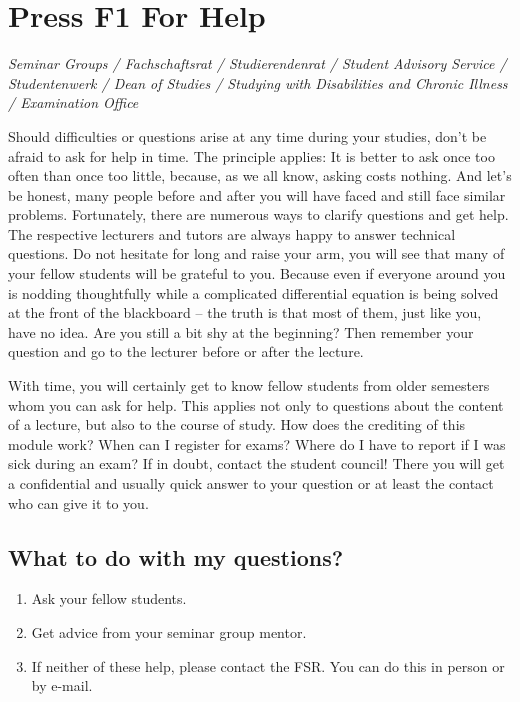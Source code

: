 \chapter{Press F1 For Help}

\textit{Seminar Groups / Fachschaftsrat / Studierendenrat / Student Advisory Service / Studentenwerk 
/ Dean of Studies / Studying with Disabilities and Chronic Illness / Examination Office}


Should difficulties or questions arise at any time during your studies, don't be afraid to ask for help in time.
The principle applies: It is better to ask once too often than once too little, because, as we all know, asking costs nothing.
And let's be honest, many people before and after you will have faced and still face similar problems.
Fortunately, there are numerous ways to clarify questions and get help.
The respective lecturers and tutors are always happy to answer technical questions.
Do not hesitate for long and raise your arm, you will see that many of your fellow students will be grateful to you.
Because even if everyone around you is nodding thoughtfully while a complicated differential equation is being solved at the front of the blackboard -- the truth is that most of them, just like you, have no idea.
Are you still a bit shy at the beginning? Then remember your question and go to the lecturer before or after the lecture.

With time, you will certainly get to know fellow students from older semesters whom you can ask for help.
This applies not only to questions about the content of a lecture, but also to the course of study.
How does the crediting of this module work? When can I register for exams? Where do I have to report if I was sick during an exam?
If in doubt, contact the student council!
There you will get a confidential and usually quick answer to your question or at least the contact who can give it to you.

\section*{What to do with my questions?}
\begin{enumerate}
\item Ask your fellow students.
\item Get advice from your seminar group mentor.
\item If neither of these help, please contact the FSR. You can do this in person or by e-mail.
\end{enumerate}


